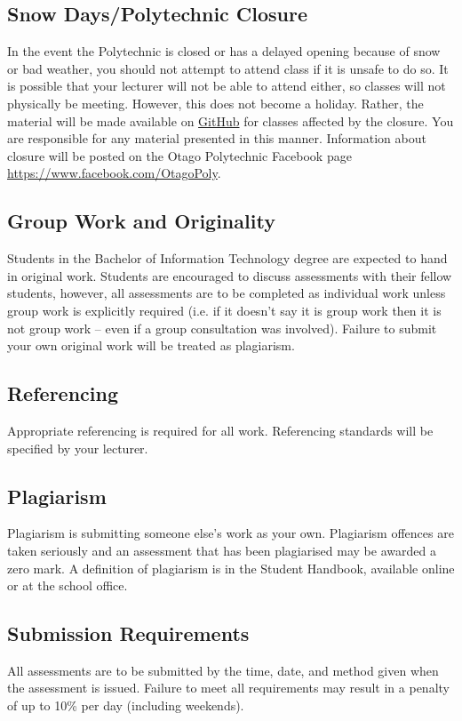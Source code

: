 \documentclass{article}
\begin{document}
\subsection*{Snow Days/Polytechnic Closure}
In the event the Polytechnic is closed or has a delayed opening because of snow or bad weather, you should not attempt to attend class if it is unsafe to do so. It is possible that your lecturer will not be able to attend either, so classes will not physically be meeting. However, this does not become a holiday. Rather, the material will be made available on \href{https://github.com/otago-polytechnic-bit-courses/intermediate-app-dev-concepts}{GitHub} for classes affected by the closure. You are responsible for any material presented in this manner. Information about closure will be posted on the Otago Polytechnic Facebook page \href{https://www.facebook.com/OtagoPoly}{https://www.facebook.com/OtagoPoly}.

\subsection*{Group Work and Originality}
Students in the Bachelor of Information Technology degree are expected to hand in original work. Students are encouraged to discuss assessments with their fellow students, however, all assessments are to be completed as individual work unless group work is explicitly required (i.e. if it doesn’t say it is group work then it is not group work – even if a group consultation was involved). Failure to submit your own original work will be treated as plagiarism.

\subsection*{Referencing}
Appropriate referencing is required for all work. Referencing standards will be specified by your lecturer.

\subsection*{Plagiarism}
Plagiarism is submitting someone else’s work as your own. Plagiarism offences are taken seriously and an assessment that has been plagiarised may be awarded a zero mark. A definition of plagiarism is in the Student Handbook, available online or at the school office.

\subsection*{Submission Requirements}
All assessments are to be submitted by the time, date, and method given when the assessment is issued. Failure to meet all requirements may result in a penalty of up to 10\% per day (including weekends).
\end{document}
